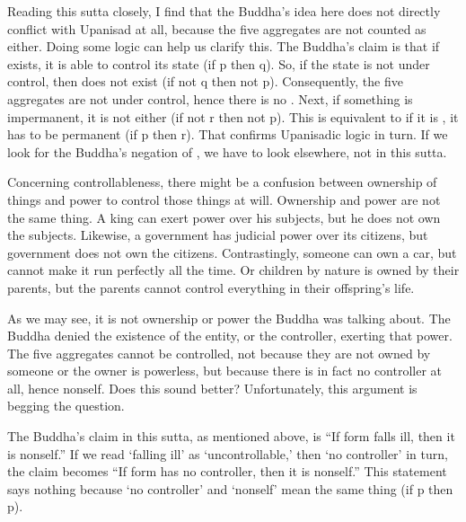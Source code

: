 Reading this sutta closely, I find that the Buddha's idea here does not directly conflict with Upanisad at all, because the five aggregates are not counted as  either. Doing some logic can help us clarify this. The Buddha's claim is that if  exists, it is able to control its state (if p then q). So, if the state is not under control, then  does not exist (if not q then not p). Consequently, the five aggregates are not under control, hence there is no . Next, if something is impermanent, it is not  either (if not r then not p). This is equivalent to if it is , it has to be permanent (if p then r). That confirms Upanisadic logic in turn. If we look for the Buddha's negation of , we have to look elsewhere, not in this sutta.

Concerning controllableness, there might be a confusion between ownership of things and power to control those things at will. Ownership and power are not the same thing. A king can exert power over his subjects, but he does not own the subjects. Likewise, a government has judicial power over its citizens, but government does not own the citizens. Contrastingly, someone can own a car, but cannot make it run perfectly all the time. Or children by nature is owned by their parents, but the parents cannot control everything in their offspring's life.

As we may see, it is not ownership or power the Buddha was talking about. The Buddha denied the existence of the entity, or the controller, exerting that power. The five aggregates cannot be controlled, not because they are not owned by someone or the owner is powerless, but because there is in fact no controller at all, hence nonself. Does this sound better? Unfortunately, this argument is begging the question.

The Buddha's claim in this sutta, as mentioned above, is ``If form falls ill, then it is nonself.'' If we read `falling ill' as `uncontrollable,' then `no controller' in turn, the claim becomes ``If form has no controller, then it is nonself.'' This statement says nothing because `no controller' and `nonself' mean the same thing (if p then p).

